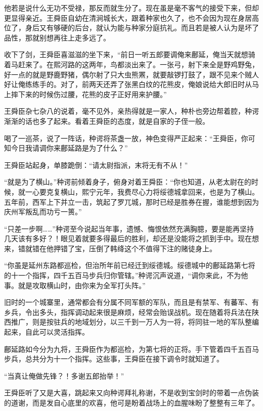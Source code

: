 他若是说什么无功不受禄，那反而就生分了。现在虽是毫不客气的接受下来，但却更显得亲近。王舜臣自幼在清涧城长大，跟着种家也久了，也不会因为现在身居高位了，身后又有够硬的后台，就认为能与种家分庭抗礼。而且若是被人认为是坏了品性，那就别想再往上走多远了。

收下了剑，王舜臣喜滋滋的坐下来，“前日一听五郎要调俺来鄜延，俺当天就想骑着马赶来了。在熙河路的这两年，鸟都淡出来了。一张弓，射下来全是野鸡野兔，好一点的就是野鹿野猪，偶尔射了只大虫熊罴，就要敲锣打鼓了，跟不见来个贼人好让俺练练手的。对了，前两天还弄了张黑白纹的花熊皮，俺娘说给大郎旧时从马上摔下来的时候伤过腰，花熊的皮子正好用来护腰。”

王舜臣杂七杂八的说着，毫不见外，亲热得就是一家人，种朴也旁边帮着腔，种谔渐渐的话也多了起来。看着王舜臣的态度，就是自家的子侄一般。

喝了一巡茶，说了一阵话，种谔将茶盏一放，神色变得严正起来：“王舜臣，你可知今日我请调你来鄜延路是为了什么？”

王舜臣站起身，单膝跪倒：“请太尉指派，末将无有不从！”

“就是为了横山。”种谔前倾着身子，俯身对着王舜臣：“你也知道，从老太尉在的时候，就一心要克复横山，熙宁元年，我费尽心力将绥德城拿回来，也是为了横山。五年前，西军上下并立一击，筑起了罗兀城，那时已经是胜券在握，谁能想到因为庆州军叛乱而功亏一篑。”

“只差一步啊……”种谔至今说起当年事，遗憾、悔恨依然充满胸臆，要是能再坚持几天该有多好？！眼见着就要多得最后的胜利，却还是没能将之抓到手中。现在想来，错就错在他押错了宝，压倒了韩绛这个不值得下注的赌徒身上。

“你虽是延州东路都巡检，但治所年前已经迁到绥德城。绥德城中的鄜延路第七将的十一个指挥，四千五百马步兵归你管辖。”种谔沉声说道，“调你来此，不为他事。就是攻取横山时，由你来为全军打头阵。”

旧时的一个城寨里，通常都会有分属不同军额的军队，而且是有禁军、有蕃军、有乡兵，令出多头，指挥调动起来很是麻烦，经常会贻误战机。现在随着将兵法在陕西推广，则是按驻兵的地域划分，以三千到一万人为一将，将同驻一地的军队整编起来，自此可以灵活指挥。

鄜延路如今分为九将，王舜臣作为都巡检，为第七将的正将。手下管着四千五百马步兵，总共分为十一个指挥。这些事，王舜臣在接下调令时就知道了。

“当真让俺做先锋？！多谢五郎抬举！”

王舜臣听了又是大喜，跳起来又向种谔拜礼称谢，不是收到宝剑时的带着一点伪装的道谢，而是发自心底里的欢喜，他可是盼着战场上的血腥味盼了整整有三年了。

